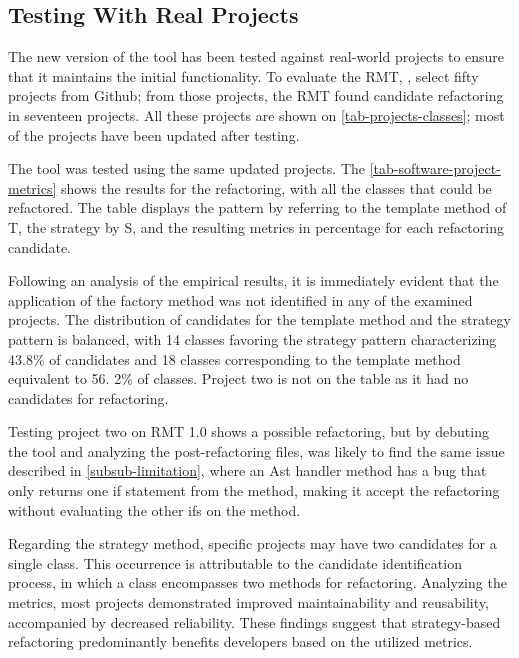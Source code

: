 \subsection{Testing With Real Projects}
\label{sub-testing-real}

The new version of the tool has been tested against real-world projects to ensure that it maintains the initial functionality. To evaluate the RMT, \textcite{beluzzo2018abordagem}, select fifty projects from Github; from those projects, the RMT found candidate refactoring in seventeen projects. All these projects are shown on \cref{tab-projects-classes}; most of the projects have been updated after \cite{beluzzo2018abordagem} testing.



The tool was tested using the same updated projects. The \cref{tab-software-project-metrics} shows the results for the refactoring, with all the classes that could be refactored. The table displays the pattern by referring to the template method of T, the strategy by S, and the resulting metrics in percentage for each refactoring candidate.

Following an analysis of the empirical results, it is immediately evident that the application of the factory method was not identified in any of the examined projects. The distribution of candidates for the template method and the strategy pattern is balanced, with 14 classes favoring the strategy pattern characterizing 43.8\% of candidates and 18 classes corresponding to the template method equivalent to 56. 2\% of classes. Project two is not on the table as it had no candidates for refactoring.

Testing project two on RMT 1.0 shows a possible refactoring, but by debuting the tool and analyzing the post-refactoring files, was likely to find the same issue described in \cref{subsub-limitation}, where an Ast handler method has a bug that only returns one if statement from the method, making it accept the refactoring without evaluating the other ifs on the method.

Regarding the strategy method, specific projects may have two candidates for a single class. This occurrence is attributable to the candidate identification process, in which a class encompasses two methods for refactoring. Analyzing the metrics, most projects demonstrated improved maintainability and reusability, accompanied by decreased reliability. These findings suggest that strategy-based refactoring predominantly benefits developers based on the utilized metrics.

